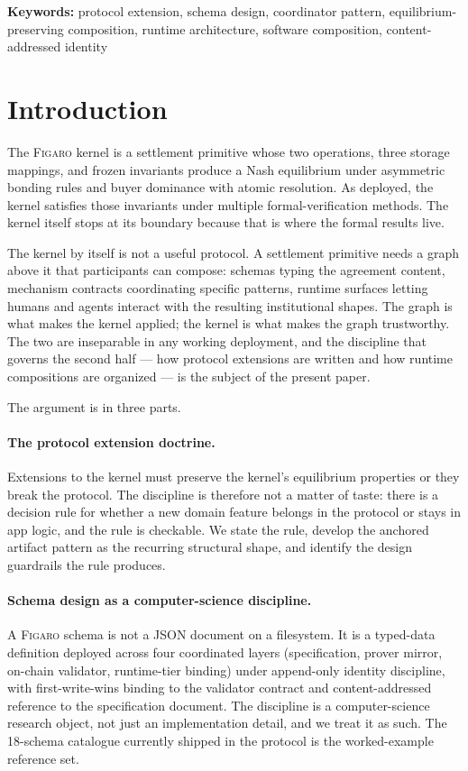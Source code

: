 \documentclass[11pt,a4paper]{article}
\theoremstyle{definition}
\theoremstyle{remark}
\newcommand{\figaro}{\textsc{Figaro}}
\begin{document}
\medskip
\noindent\textbf{Keywords:}
protocol extension, schema design, coordinator pattern, equilibrium-preserving composition,
runtime architecture, software composition, content-addressed identity

\section{Introduction}
\label{sec:intro}

The \figaro{} kernel is a settlement primitive whose two operations,
three storage mappings, and frozen invariants produce a Nash
equilibrium under asymmetric bonding rules and buyer dominance with
atomic resolution. As deployed, the kernel satisfies those
invariants under multiple formal-verification methods. The kernel
itself stops at its boundary because that is where the formal
results live.

The kernel by itself is not a useful protocol. A settlement primitive
needs a graph above it that participants can compose: schemas typing
the agreement content, mechanism contracts coordinating specific
patterns, runtime surfaces letting humans and agents interact with
the resulting institutional shapes. The graph is what makes the
kernel applied; the kernel is what makes the graph trustworthy. The
two are inseparable in any working deployment, and the discipline
that governs the second half — how protocol extensions are written
and how runtime compositions are organized — is the subject of the
present paper.

The argument is in three parts.

\paragraph{The protocol extension doctrine.}
Extensions to the kernel must preserve the kernel's equilibrium
properties or they break the protocol. The discipline is therefore
not a matter of taste: there is a decision rule for whether a new
domain feature belongs in the protocol or stays in app logic, and
the rule is checkable. We state the rule, develop the anchored
artifact pattern as the recurring structural shape, and identify
the design guardrails the rule produces.

\paragraph{Schema design as a computer-science discipline.}
A \figaro{} schema is not a JSON document on a filesystem. It is a
typed-data definition deployed across four coordinated layers
(specification, prover mirror, on-chain validator, runtime-tier
binding) under append-only identity discipline, with first-write-wins
binding to the validator contract and content-addressed reference
to the specification document. The discipline is a computer-science
research object, not just an implementation detail, and we treat it
as such. The 18-schema catalogue currently shipped in the protocol
is the worked-example reference set.
\end{document}
